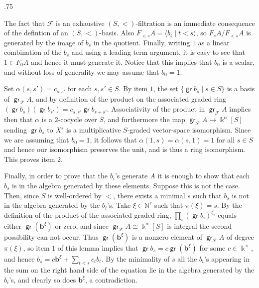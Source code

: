 \documentclass[11pt,fleqn]{article}
\makeatletter
\renewenvironment{proof}[1][\textit{Proof}]{\par
  \pushQED{\qed}%
  \normalfont \topsep.75\paraskip\relax
  \trivlist
  \item[\hskip\labelsep
        \itshape
    #1\@addpunct{.}]\ignorespaces
}{%
  \popQED\endtrivlist\@endpefalse
}
\newcommand\NN{\mathbb N}
\renewcommand\to{\longrightarrow}
\newcommand\F{\mathcal F}
\renewcommand\b{\mathbf b}
\renewcommand\k{\Bbbk}
\DeclareMathOperator\gr{\mathsf{gr}}
\makeatother
\begin{document}
\begin{proof}
The fact that $\F$ is an exhaustive $(S,<)$-filtration is an immediate 
consequence of the defintion of an $(S,<)$-basis. Also $F_{<s}A = \langle b_t 
\mid t < s\rangle$, so $F_sA / F_{<s}A$ is generated by the image of $b_s$ in 
the quotient. Finally, writing $1$ as a linear combination of the $b_s$
and using a leading term argument, it is easy to see that $1 \in F_0A$ and 
hence it must generate it. Notice that this implies that $b_0$ is a scalar, 
and without loss of generality we may assume that $b_0 = 1$.

Set $\alpha(s,s') = c_{s,s'}$ for each $s,s' \in S$. By item $1$, the set 
$\{\gr b_s \mid s \in S\}$ is a basis of $\gr_\F A$, and by definition of the 
product on the associated graded ring $(\gr b_s) (\gr b_{s'}) = c_{s,s'} \gr 
b_{s+s'}$. Associativity of the product in $\gr_\F A$ implies then that 
$\alpha$ is a $2$-cocycle over $S$, and furthermore the map $\gr_\F A \to 
\k^\alpha[S]$ sending $\gr b_s$ to $X^s$ is a multiplicative $S$-graded 
vector-space isomorphism. Since we are assuming that $b_0 = 1$, it follows 
that $\alpha(1,s) = \alpha(s,1) = 1$ for all $s \in S$ and hence our 
isomorphism preserves the unit, and is thus a ring isomorphism.
This proves item 2.

Finally, in order to prove that the $b_i$'s generate $A$ it is enough to show 
that each $b_s$ is in the algebra generated by these elements. Suppose this is 
not the case. Then, since $S$ is well-ordered by $<$, there exists a minimal 
$s$ such that $b_s$ is not in the algebra generated by the $b_i$'s. Take $\xi 
\in \NN^r$ such that $\pi(\xi) = s$. By the definition of the product of the 
associated graded ring, $\prod_i(\gr b_i)^{\xi_i}$ equals either $\gr (\b^\xi)$
or zero, and since $\gr_\F A \cong \k^\alpha[S]$ is integral the second 
possibility can not occur. Thus $\gr(\b^\xi)$ is a nonzero element of $\gr_\F 
A$ of degree $\pi(\xi)$, so item 1 of this lemma implies that $\gr b_s = 
c\gr(\b^\xi)$ for some $c \in \k^\times$, and hence $b_s  = c\b^\xi + 
\sum_{t<s} c_t b_t$. By the minimality of $s$ all the $b_t$'s appearing in the 
sum on the right hand side of the equation lie in the algebra generated by the 
$b_i$'s, and clearly so does $\b^\xi$, a contradiction. 
\end{proof}
\end{document}
